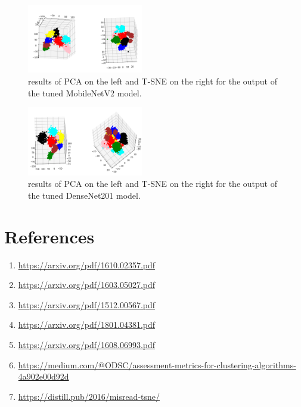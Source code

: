\documentclass[conference]{IEEEtran}
\begin{document}
\begin{figure}[htbp]
\centerline{\includegraphics[width=0.45\textwidth]{MobileNet_fine}}
\caption{results of PCA on the left and T-SNE on the right for the output of the tuned MobileNetV2 model.}
\label{MobileNet_fine}
\end{figure}
\begin{figure}[htbp]
\centerline{\includegraphics[width=0.45\textwidth]{DenseNet_fine}}
\caption{results of PCA on the left and T-SNE on the right for the output of the tuned DenseNet201 model.}
\label{DenseNet_fine}
\end{figure}


\clearpage
\section*{References}
\begin{enumerate}
\item{\url{https://arxiv.org/pdf/1610.02357.pdf} \label{1}}
\item{\url{https://arxiv.org/pdf/1603.05027.pdf} \label{2}}
\item{\url{https://arxiv.org/pdf/1512.00567.pdf} \label{3}}
\item{\url{https://arxiv.org/pdf/1801.04381.pdf} \label{4}}
\item{\url{https://arxiv.org/pdf/1608.06993.pdf} \label{5}}
\item{\url{https://medium.com/@ODSC/assessment-metrics-for-clustering-algorithms-4a902e00d92d} \label{6}}
\item{\url{https://distill.pub/2016/misread-tsne/}\label{7}}
\end{enumerate}
\end{document}
